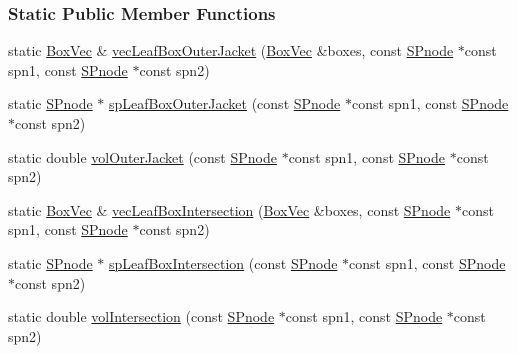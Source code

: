 \subsubsection*{\-Static \-Public \-Member \-Functions}
\begin{DoxyCompactItemize}
\item 
static \hyperlink{namespacesubpavings_a322c2661740f6e6cc815fff0bfbd2623}{\-Box\-Vec} \& \hyperlink{classsubpavings_1_1SPnode_a2f68ecee896eb24708a4a3045ddc38b4}{vec\-Leaf\-Box\-Outer\-Jacket} (\hyperlink{namespacesubpavings_a322c2661740f6e6cc815fff0bfbd2623}{\-Box\-Vec} \&boxes, const \hyperlink{classsubpavings_1_1SPnode}{\-S\-Pnode} $\ast$const spn1, const \hyperlink{classsubpavings_1_1SPnode}{\-S\-Pnode} $\ast$const spn2)
\item 
static \hyperlink{classsubpavings_1_1SPnode}{\-S\-Pnode} $\ast$ \hyperlink{classsubpavings_1_1SPnode_ad7fd31c8579c501476dcc7004e52c1d6}{sp\-Leaf\-Box\-Outer\-Jacket} (const \hyperlink{classsubpavings_1_1SPnode}{\-S\-Pnode} $\ast$const spn1, const \hyperlink{classsubpavings_1_1SPnode}{\-S\-Pnode} $\ast$const spn2)
\item 
static double \hyperlink{classsubpavings_1_1SPnode_a57f1a92689c116edcf2bf6a62497970f}{vol\-Outer\-Jacket} (const \hyperlink{classsubpavings_1_1SPnode}{\-S\-Pnode} $\ast$const spn1, const \hyperlink{classsubpavings_1_1SPnode}{\-S\-Pnode} $\ast$const spn2)
\item 
static \hyperlink{namespacesubpavings_a322c2661740f6e6cc815fff0bfbd2623}{\-Box\-Vec} \& \hyperlink{classsubpavings_1_1SPnode_afb2b268ccd3ddfa61cdcadb866933351}{vec\-Leaf\-Box\-Intersection} (\hyperlink{namespacesubpavings_a322c2661740f6e6cc815fff0bfbd2623}{\-Box\-Vec} \&boxes, const \hyperlink{classsubpavings_1_1SPnode}{\-S\-Pnode} $\ast$const spn1, const \hyperlink{classsubpavings_1_1SPnode}{\-S\-Pnode} $\ast$const spn2)
\item 
static \hyperlink{classsubpavings_1_1SPnode}{\-S\-Pnode} $\ast$ \hyperlink{classsubpavings_1_1SPnode_abe8c17244a31a4003e59f48a56e61ac4}{sp\-Leaf\-Box\-Intersection} (const \hyperlink{classsubpavings_1_1SPnode}{\-S\-Pnode} $\ast$const spn1, const \hyperlink{classsubpavings_1_1SPnode}{\-S\-Pnode} $\ast$const spn2)
\item 
static double \hyperlink{classsubpavings_1_1SPnode_aff141c8fe2b44b5da47319563f335fd3}{vol\-Intersection} (const \hyperlink{classsubpavings_1_1SPnode}{\-S\-Pnode} $\ast$const spn1, const \hyperlink{classsubpavings_1_1SPnode}{\-S\-Pnode} $\ast$const spn2)
\item 

\end{DoxyCompactItemize}
